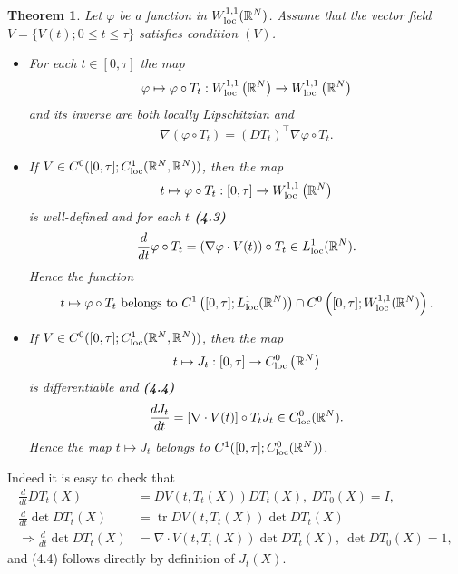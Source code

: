 \documentclass[oneside]{book}
\numberwithin{equation}{section}
\newtheorem{theorem}{Theorem}[section]
\begin{document}
\begin{theorem}
    Let $\varphi$ be a function in $W_{\rm loc}^{1,1}(\mathbb{R}^N)$. Assume that the vector field $V = \{V(t);0\le t\le\tau\}$ satisfies condition $(V)$.
    \begin{itemize}
        \item[(i)] For each $t\in[0,\tau]$ the map
        \begin{align*}
            \varphi\mapsto\varphi\circ T_t:W_{\rm loc}^{1,1}\left(\mathbb{R}^N\right)\to W_{\rm loc}^{1,1}\left(\mathbb{R}^N\right)
        \end{align*}
        and its inverse are both locally Lipschitzian and
        \begin{align*}
            \nabla\left(\varphi\circ T_t\right) = (DT_t)^\top\nabla\varphi\circ T_t.
        \end{align*}
        \item[(ii)] If $V\in C^0([0,\tau];C_{\rm loc}^1(\mathbb{R}^N,\mathbb{R}^N))$, then the map
        \begin{align*}
            t\mapsto\varphi\circ T_t:[0,\tau]\to W_{\rm loc}^{1,1}\left(\mathbb{R}^N\right)
        \end{align*}
        is well-defined and for each $t$ \textbf{(4.3)}
        \begin{align*}
            \frac{d}{dt}\varphi\circ T_t = \left(\nabla\varphi\cdot V(t)\right)\circ T_t\in L_{\rm loc}^1(\mathbb{R}^N).
        \end{align*}
        Hence the function
        \begin{align*}
            t\mapsto\varphi\circ T_t \mbox{ belongs to } C^1\left([0,\tau];L_{\rm loc}^1(\mathbb{R}^N)\right)\cap C^0\left([0,\tau];W_{\rm loc}^{1,1}(\mathbb{R}^N)\right).
        \end{align*}
        \item[(iii)] If $V\in C^0([0,\tau];C_{\rm loc}^1(\mathbb{R}^N,\mathbb{R}^N))$, then the map
        \begin{align*}
            t\mapsto J_t:[0,\tau]\to C_{\rm loc}^0\left(\mathbb{R}^N\right)
        \end{align*}
        is differentiable and \textbf{(4.4)}
        \begin{align*}
            \frac{dJ_t}{dt} = \left[\nabla\cdot V(t)\right]\circ T_tJ_t\in C_{\rm loc}^0(\mathbb{R}^N).
        \end{align*}
        Hence the map $t\mapsto J_t$ belongs to $C^1([0,\tau];C_{\rm loc}^0(\mathbb{R}^N))$.
    \end{itemize}
\end{theorem}
Indeed it is easy to check that
\begin{align*}
    \frac{d}{dt}DT_t(X) &= DV\left(t,T_t(X)\right)DT_t(X),\ DT_0(X) = I,\\
    \frac{d}{dt}\det DT_t(X) &= \operatorname{tr}DV\left(t,T_t(X)\right)\det DT_t(X)\\
    \Rightarrow\frac{d}{dt}\det DT_t(X) &= \nabla\cdot V\left(t,T_t(X)\right)\det DT_t(X),\ \det DT_0(X) = 1,
\end{align*}
and (4.4) follows directly by definition of $J_t(X)$.
\end{document}
